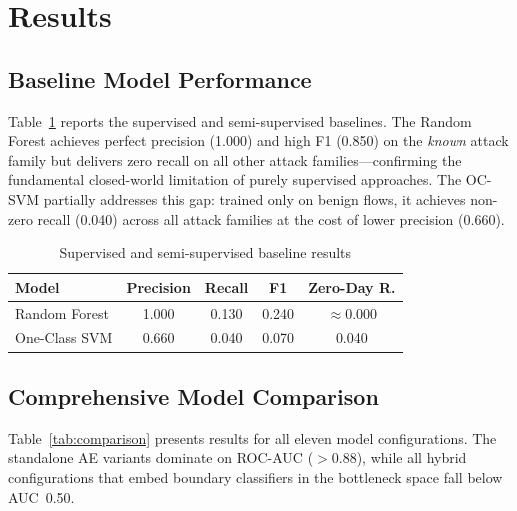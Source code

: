 \documentclass[10pt,journal,compsoc]{IEEEtran}
\begin{document}
\section{Results}
\label{sec:results}

\subsection{Baseline Model Performance}

Table~\ref{tab:baseline} reports the supervised and semi-supervised
baselines.  The Random Forest achieves perfect precision (1.000) and
high F1 (0.850) on the \emph{known} attack family but delivers zero
recall on all other attack families---confirming the fundamental
closed-world limitation of purely supervised approaches.  The OC-SVM
partially addresses this gap: trained only on benign flows, it achieves
non-zero recall (0.040) across all attack families at the cost of lower
precision (0.660).

\begin{table}[htbp]
\centering
\caption{Supervised and semi-supervised baseline results}
\label{tab:baseline}
\begin{tabular}{lcccc}
\toprule
\textbf{Model} & \textbf{Precision} & \textbf{Recall} & \textbf{F1} & \textbf{Zero-Day R.} \\
\midrule
Random Forest   & 1.000 & 0.130 & 0.240 & $\approx$0.000 \\
One-Class SVM   & 0.660 & 0.040 & 0.070 & 0.040 \\
\bottomrule
\end{tabular}
\end{table}

\subsection{Comprehensive Model Comparison}

Table~\ref{tab:comparison} presents results for all eleven model
configurations.  The standalone AE variants dominate on ROC-AUC
($>$0.88), while all hybrid configurations that embed boundary
classifiers in the bottleneck space fall below AUC~0.50.
\end{document}

